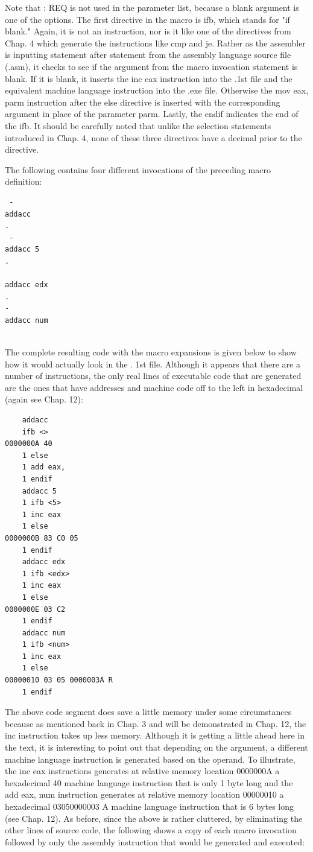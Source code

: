 \documentclass[10pt]{book}
\begin{document}
Note that : REQ is not used in the parameter list, because a blank argument is one of the options. The first directive in the macro is ifb, which stands for "if blank." Again, it is not an instruction, nor is it like one of the directives from Chap. 4 which generate the instructions like cmp and je. Rather as the assembler is inputting statement after statement from the assembly language source file (.asm), it checks to see if the argument from the macro invocation statement is blank. If it is blank, it inserts the inc eax instruction into the .1st file and the equivalent machine language instruction into the .exe file. Otherwise the mov eax, parm instruction after the else directive is inserted with the corresponding argument in place of the parameter parm. Lastly, the endif indicates the end of the ifb. It should be carefully noted that unlike the selection statements introduced in Chap. 4, none of these three directives have a decimal prior to the directive.

The following contains four different invocations of the preceding macro definition:

\begin{verbatim}
 -
addacc
.
 -
addacc 5
.
 
addacc edx
.
-
addacc num
  
\end{verbatim}

The complete resulting code with the macro expansions is given below to show how it would actually look in the . 1st file. Although it appears that there are a number of instructions, the only real lines of executable code that are generated are the ones that have addresses and machine code off to the left in hexadecimal (again see Chap. 12):

\begin{verbatim}
    addacc
    ifb <>
0000000A 40
    1 else
    1 add eax,
    1 endif
    addacc 5
    1 ifb <5>
    1 inc eax
    1 else
0000000B 83 C0 05
    1 endif
    addacc edx
    1 ifb <edx>
    1 inc eax
    1 else
0000000E 03 C2
    1 endif
    addacc num
    1 ifb <num>
    1 inc eax
    1 else
00000010 03 05 0000003A R
    1 endif
\end{verbatim}

The above code segment does save a little memory under some circumstances because as mentioned back in Chap. 3 and will be demonstrated in Chap. 12, the inc instruction takes up less memory. Although it is getting a little ahead here in the text, it is interesting to point out that depending on the argument, a different machine language instruction is generated based on the operand. To illustrate, the inc eax instructions generates at relative memory location 0000000A a hexadecimal 40 machine language instruction that is only 1 byte long and the add eax, num instruction generates at relative memory location 00000010 a hexadecimal 03050000003 A machine language instruction that is 6 bytes long (see Chap. 12). As before, since the above is rather cluttered, by eliminating the other lines of source code, the following shows a copy of each macro invocation followed by only the assembly instruction that would be generated and executed:
\end{document}
